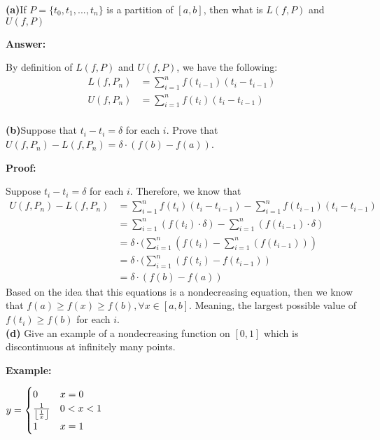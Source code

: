 \documentclass[a4paper,12pt]{report}
\DeclarePairedDelimiter\floor{\lfloor}{\rfloor}
\begin{document}
\noindent
\textbf{(a)}If $P=\{t_0,t_1,...,t_n\}$ is a partition of $[a,b]$, then what is $L(f,P)$ and $U(f,P)$

\noindent
\textbf{Answer: }

\noindent
By definition of $L(f,P)$ and $U(f,P)$, we have the following:
\begin{align*}
L(f,P_n)&=\sum_{i=1}^{n}f(t_{i-1})(t_i-t_{i-1})\\
U(f,P_n)&=\sum_{i=1}^{n}f(t_{i})(t_i-t_{i-1})\\
\end{align*}

\noindent
\textbf{(b)}Suppose that $t_{i}-t_{i}=\delta$ for each $i$. Prove that $U(f,P_n)-L(f,P_n)=\delta\cdot(f(b)-f(a))$.

\noindent
\textbf{Proof: }

\noindent
Suppose $t_{i}-t_{i}=\delta$ for each $i$. Therefore, we know that 
\begin{align*}
U(f,P_n)-L(f,P_n)&=\sum_{i=1}^{n}f(t_{i})(t_i-t_{i-1})-\sum_{i=1}^{n}f(t_{i-1})(t_i-t_{i-1})\\
&=\sum_{i=1}^{n}(f(t_{i})\cdot{\delta})-\sum_{i=1}^{n}(f(t_{i-1})\cdot{\delta})\\
&=\delta\cdot{(\sum_{i=1}^{n}(f(t_{i})-\sum_{i=1}^{n}(f(t_{i-1})))}\\
&=\delta\cdot{(\sum_{i=1}^{n}(f(t_{i})-f(t_{i-1}))}\\
&=\delta\cdot{(f(b)-f(a))}
\end{align*}
Based on the idea that this equations is a nondecreasing equation, then we know that $f(a)\geq f(x)\geq f(b), \forall x\in [a,b]$. Meaning, the largest possible value of $f(t_i)\geq f(b)$ for each $i$.  \\

\noindent
\textbf{(d)} Give an example of a nondecreasing function on $[0,1]$ which is discontinuous at infinitely many points. 

\noindent
\textbf{Example: }

 $y =
    \begin{cases}
      0 & x=0\\
      \frac{1}{\floor*{\frac{1}{x}}} & 0<x<1\\
      1 & x=1
    \end{cases}  $
\end{document}
